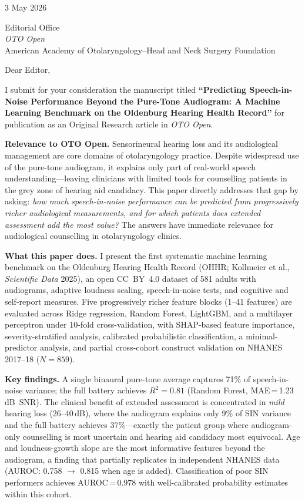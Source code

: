 \documentclass[12pt,a4paper]{article}
\begin{document}
3 May 2026

Editorial Office\\
\textit{OTO Open}\\
American Academy of Otolaryngology--Head and Neck Surgery Foundation

\bigskip

Dear Editor,

I submit for your consideration the manuscript titled \textbf{``Predicting
Speech-in-Noise Performance Beyond the Pure-Tone Audiogram: A Machine
Learning Benchmark on the Oldenburg Hearing Health Record''} for publication
as an Original Research article in \textit{OTO Open}.

\textbf{Relevance to OTO Open.}
Sensorineural hearing loss and its audiological management are core domains
of otolaryngology practice.  Despite widespread use of the pure-tone
audiogram, it explains only part of real-world speech understanding---leaving
clinicians with limited tools for counselling patients in the grey zone of
hearing aid candidacy.  This paper directly addresses that gap by asking:
\emph{how much speech-in-noise performance can be predicted from progressively
richer audiological measurements, and for which patients does extended
assessment add the most value?}  The answers have immediate relevance for
audiological counselling in otolaryngology clinics.

\textbf{What this paper does.}
I present the first systematic machine learning benchmark on the Oldenburg
Hearing Health Record (OHHR; Kollmeier et al., \textit{Scientific Data}
2025), an open CC~BY~4.0 dataset of 581 adults with audiograms, adaptive
loudness scaling, speech-in-noise tests, and cognitive and self-report
measures.  Five progressively richer feature blocks (1--41 features) are
evaluated across Ridge regression, Random Forest, LightGBM, and a multilayer
perceptron under 10-fold cross-validation, with SHAP-based feature
importance, severity-stratified analysis, calibrated probabilistic
classification, a minimal-predictor analysis, and partial cross-cohort
construct validation on NHANES 2017--18 ($N{=}859$).

\textbf{Key findings.}
A single binaural pure-tone average captures 71\% of speech-in-noise
variance; the full battery achieves $R^2{=}0.81$ (Random Forest,
MAE\,=\,1.23\,dB~SNR).  The clinical benefit of extended assessment is
concentrated in \emph{mild} hearing loss (26--40\,dB), where the audiogram
explains only 9\% of SIN variance and the full battery achieves 37\%---exactly
the patient group where audiogram-only counselling is most uncertain and
hearing aid candidacy most equivocal.  Age and loudness-growth slope are the
most informative features beyond the audiogram, a finding that partially
replicates in independent NHANES data (AUROC: 0.758 $\to$ 0.815 when age is
added).  Classification of poor SIN performers achieves AUROC\,=\,0.978 with
well-calibrated probability estimates within this cohort.
\end{document}
